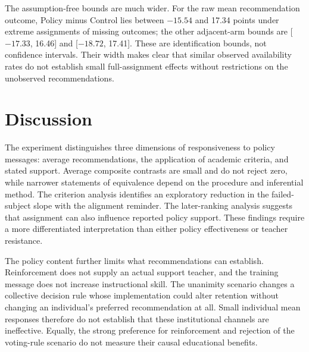 The assumption-free bounds are much wider. For the raw mean recommendation outcome, Policy minus Control lies between $-15.54$ and 17.34 points under extreme assignments of missing outcomes; the other adjacent-arm bounds are [$-17.33$, 16.46] and [$-18.72$, 17.41]. These are identification bounds, not confidence intervals. Their width makes clear that similar observed availability rates do not establish small full-assignment effects without restrictions on the unobserved recommendations.

\section{Discussion}
The experiment distinguishes three dimensions of responsiveness to policy messages: average recommendations, the application of academic criteria, and stated support. Average composite contrasts are small and do not reject zero, while narrower statements of equivalence depend on the procedure and inferential method. The criterion analysis identifies an exploratory reduction in the failed-subject slope with the alignment reminder. The later-ranking analysis suggests that assignment can also influence reported policy support. These findings require a more differentiated interpretation than either policy effectiveness or teacher resistance.


The policy content further limits what recommendations can establish. Reinforcement does not supply an actual support teacher, and the training message does not increase instructional skill. The unanimity scenario changes a collective decision rule whose implementation could alter retention without changing an individual's preferred recommendation at all. Small individual mean responses therefore do not establish that these institutional channels are ineffective. Equally, the strong preference for reinforcement and rejection of the voting-rule scenario do not measure their causal educational benefits.


